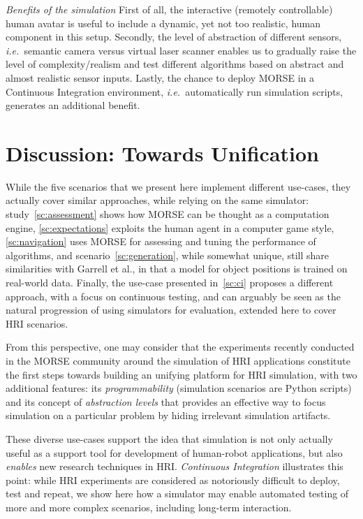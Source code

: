\documentclass{llncs}
\newcommand{\ie}{{\textit{i.e.~}}}
\begin{document}
\emph{Benefits of the simulation} First of all, the interactive (remotely
controllable) human avatar is useful to include a dynamic, yet not too
realistic, human component in this setup. Secondly, the level of abstraction of different
sensors, \ie semantic camera versus virtual laser scanner enables us to
gradually raise the level of complexity/realism and test different algorithms
based on abstract and almost realistic sensor inputs. Lastly, the chance to
deploy MORSE in a Continuous Integration environment, \ie automatically run
simulation scripts, generates an additional benefit.

\section{Discussion: Towards Unification}

While the five scenarios that we present here implement different use-cases,
they actually cover similar approaches, while relying on the same simulator:
study~\ref{sc:assessment} shows how MORSE can be thought as a computation
engine, \ref{sc:expectations} exploits the human agent in a computer game style,
\ref{sc:navigation} uses MORSE for assessing and tuning the performance of
algorithms, and scenario~\ref{sc:generation}, while somewhat unique, still share
similarities with Garrell et al., in that a model for object positions is
trained on real-world data. Finally, the use-case presented in~\ref{sc:ci}
proposes a different approach, with a focus on continuous testing, and can
arguably be seen as the natural progression of using simulators for evaluation,
extended here to cover HRI scenarios.

From this perspective, one may consider that the experiments recently conducted
in the MORSE community around the simulation of HRI applications constitute the
first steps towards building an unifying platform for HRI simulation, with two
additional features: its \emph{programmability} (simulation scenarios are Python
scripts) and its concept of \emph{abstraction levels} that provides an effective
way to focus simulation on a particular problem by hiding irrelevant simulation
artifacts.

These diverse use-cases support the idea that simulation is not only actually
useful as a support tool for development of human-robot applications, but also
\emph{enables} new research techniques in HRI. \emph{Continuous Integration}
illustrates this point: while HRI experiments are considered as notoriously
difficult to deploy, test and repeat, we show here how a simulator may enable
automated testing of more and more complex scenarios, including long-term
interaction.
\end{document}
